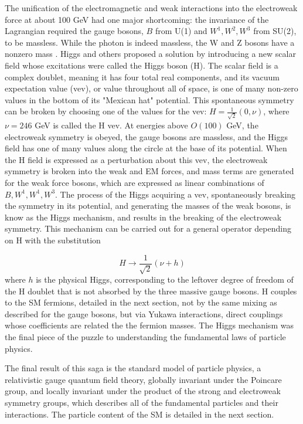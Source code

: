 \indent The unification of the electromagnetic and weak interactions into the electroweak force at about 100 GeV had one major shortcoming: the invariance of the Lagrangian required the gauge bosons, $B$ from U(1) and $W^1, W^2, W^3$ from SU(2), to be massless. While the photon is indeed massless, the W and Z bosons have a nonzero mass \cite{}. Higgs and others \cite{PhysRevLett.13.321, Higgs:1964ia, PhysRevLett.13.508, PhysRevLett.13.585, PhysRev.145.1156, Kibble:1967sv} proposed a solution by introducing a new scalar field whose excitations were called the Higgs boson (H). The scalar field is a complex doublet, meaning it has four total real components, and its vacuum expectation value (vev), or value throughout all of space, is one of many non-zero values in the bottom of its "Mexican hat" potential. This spontaneous symmetry can be broken by choosing one of the values for the vev: $H = \frac{1}{\sqrt{2}} (0, \nu)$, where $\nu=246$ GeV is called the H vev. At energies above $O(100)$ GeV, the electroweak symmetry is obeyed, the gauge bosons are massless, and the Higgs field has one of many values along the circle at the base of its potential. When the H field is expressed as a perturbation about this vev, the electroweak symmetry is broken into the weak and EM forces, and mass terms are generated for the weak force bosons, which are expressed as linear combinations of $B, W^1, W^1, W^3$. The process of the Higgs acquiring a vev, spontaneously breaking the symmetry in its potential, and generating the masses of the weak bosons, is know as the Higgs mechanism, and results in the breaking of the electroweak symmetry. This mechanism can be carried out for a general operator depending on H with the substitution

\begin{equation}
H \rightarrow \frac{1}{\sqrt{2}} (\nu + h)
\end{equation}
where $h$ is the physical Higgs, corresponding to the leftover degree of freedom of the H doublet that is not absorbed by the three massive gauge bosons. H couples to the SM fermions, detailed in the next section, not by the same mixing as described for the gauge bosons, but via Yukawa interactions, direct couplings whose coefficients are related the the fermion masses. The Higgs mechanism was the final piece of the puzzle to understanding the fundamental laws of particle physics.
 
\indent The final result of this saga is the standard model of particle physics, a relativistic gauge quantum field theory, globally invariant under the Poincare group, and locally invariant under the product of the strong and electroweak symmetry groups, which describes all of the fundamental particles and their interactions. The particle content of the SM is detailed in the next section.

